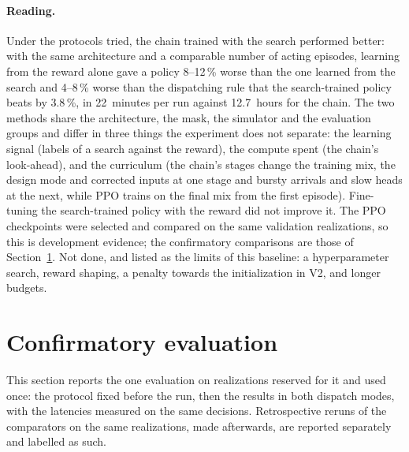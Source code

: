 \documentclass[11pt,a4paper]{article}
\theoremstyle{plain}
\theoremstyle{definition}
\theoremstyle{remark}
\begin{document}
\paragraph{Reading.}
Under the protocols tried, the chain trained with the search performed better: with the
same architecture and a comparable number of acting episodes, learning from the reward
alone gave a policy 8--12\,\% worse than the one learned from the search and 4--8\,\%
worse than the dispatching rule that the search-trained policy beats by 3.8\,\%, in
22~minutes per run against 12.7~hours for the chain. The two methods share the
architecture, the mask, the simulator and the evaluation groups and differ in three
things the experiment does not separate: the learning signal (labels of a search
against the reward), the compute spent (the chain's look-ahead), and the curriculum
(the chain's stages change the training mix, the design mode and corrected inputs at
one stage and bursty arrivals and slow heads at the next, while PPO trains on the
final mix from the first episode).
Fine-tuning the search-trained policy with the reward did not improve it. The PPO
checkpoints were selected and compared on the same validation realizations, so this is
development evidence; the confirmatory comparisons are those of Section~\ref{sec:confirm}.
Not done, and listed as the limits of this baseline: a hyperparameter search, reward
shaping, a penalty towards the initialization in V2, and longer budgets.

\section{Confirmatory evaluation}\label{sec:confirm}

This section reports the one evaluation on realizations reserved for it and used once: the protocol fixed before the run, then the results in both dispatch modes, with the latencies measured on the same decisions. Retrospective reruns of the comparators on the same realizations, made afterwards, are reported separately and labelled as such.
\end{document}
